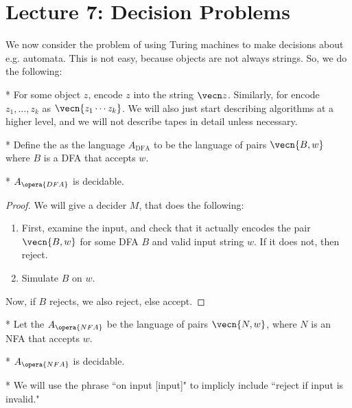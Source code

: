 \section*{Lecture 7: Decision Problems}
\setcounter{section}{7}

We now consider the problem of using Turing machines to make decisions about e.g. automata.
This is not easy, because objects are not always strings. So, we do the following:

\begin{defn}*
	For some object $z$, encode $z$ into the string $\vecn z$.
	Similarly, for encode $z_1, \ldots, z_k$ as $\vecn{z_1\cdots z_k}$.
	We will also just start describing algorithms at a higher level, and we will not describe tapes in detail unless necessary.
\end{defn}

\begin{defn}*
	Define the  as the language $A_{\operatorname{DFA}}$ to be the language of pairs $\vecn{B,w}$ where $B$ is a DFA that accepts $w$.
\end{defn}

\begin{fact}*
	$A_{\opera{DFA}}$ is decidable.
\end{fact}

\begin{proof}
	We will give a decider $M$, that does the following:
	\begin{enumerate}
		\item First, examine the input, and check that it actually encodes the pair $\vecn{B,w}$ for some DFA $B$ and valid input string $w$. 
			If it does not, then reject.
		\item Simulate $B$ on $w$.
	\end{enumerate}
	Now, if $B$ rejects, we also reject, else accept.
\end{proof}

\begin{defn}*
	Let the  $A_{\opera{NFA}}$ be the language of pairs $\vecn{N,w}$, where $N$ is an NFA that accepts $w$.
\end{defn}

\begin{fact}*
	$A_{\opera{NFA}}$ is decidable.
\end{fact}

\begin{defn}*
	We will use the phrase ``on input [input]" to implicly include ``reject if input is invalid."
\end{defn}

